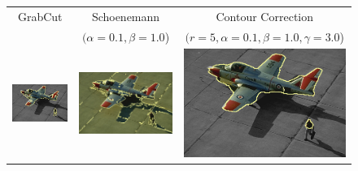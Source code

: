 \documentclass[smallextended]{svjour3}       %
\begin{document}
{{\begin{figure}[hp!]
	\center
	\begin{tabular}{ccc}
		GrabCut & Schoenemann & Contour Correction \\
		& $(\alpha=0.1, \beta=1.0$) & $(r=5, \alpha=0.1, \beta=1.0, \gamma=3.0$)\\
		\includegraphics[scale=0.2]{images/segmentation/bc/airplane2/gc-seg.png} &
		\includegraphics[scale=0.2]{images/segmentation/schoenemann/airplane2/airplane2-seg.png} &
		\includegraphics[scale=0.2]{images/segmentation/bc/airplane2/corrected-seg.png}\\						

\end{tabular}
\end{figure}}}
\end{document}

